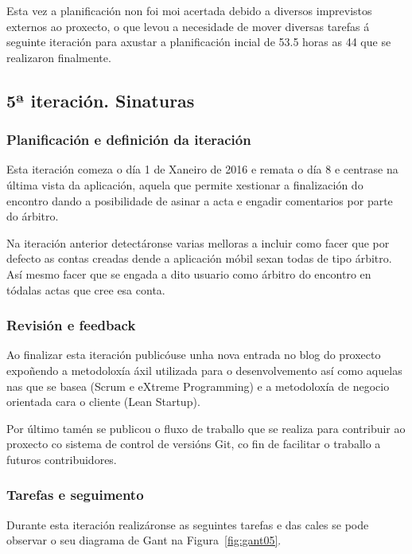       Esta vez a planificación non foi moi acertada debido a diversos 
imprevistos externos ao proxecto, o que levou a necesidade de mover diversas 
tarefas á seguinte iteración para axustar a planificación incial de 53.5 horas 
as 44 que se realizaron finalmente.

    \subsection{5ª iteración. Sinaturas}

      \subsubsection{Planificación e definición da iteración}
      Esta iteración comeza o día 1 de Xaneiro de 2016 e remata o día 8 
e centrase na última vista da aplicación, aquela que permite xestionar a 
finalización do encontro dando a posibilidade de asinar a acta e engadir 
comentarios por parte do árbitro.

      Na iteración anterior detectáronse varias melloras a incluir como facer 
que por defecto as contas creadas dende a aplicación móbil sexan todas de tipo 
árbitro. Así mesmo facer que se engada a dito usuario como árbitro do encontro 
en tódalas actas que cree esa conta.

      \subsubsection{Revisión e feedback}
      Ao finalizar esta iteración publicóuse unha nova entrada no blog do 
proxecto expoñendo a metodoloxía áxil utilizada para o desenvolvemento así como 
aquelas nas que se basea (Scrum e eXtreme Programming) e a metodoloxía de 
negocio orientada cara o cliente (Lean Startup).

      Por último tamén se publicou o fluxo de traballo que se realiza para 
contribuir ao proxecto co sistema de control de versións Git, co fin de 
facilitar o traballo a futuros contribuidores.

      \subsubsection{Tarefas e seguimento}

      Durante esta iteración realizáronse as seguintes tarefas e das cales se 
pode observar o seu diagrama de Gant na Figura~\ref{fig:gant05}.


